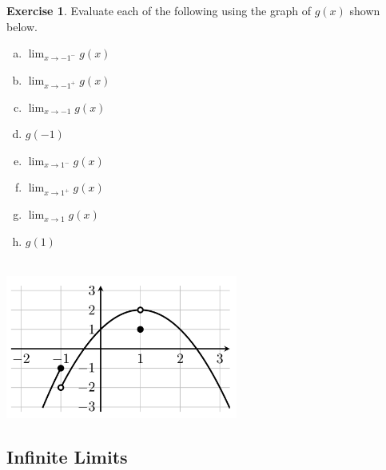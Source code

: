 \documentclass[11pt,reqno,final]{amsart}
\numberwithin{equation}{section}
\numberwithin{figure}{section}
\theoremstyle{definition} %
\newtheorem{exercise}[question]{Exercise}
\begin{document}
\begin{exercise}
        Evaluate each of the following using the graph of $g(x)$ shown below.\\

        \begin{minipage}{.5\textwidth}
                \begin{enumerate}[(a)]\itemsep+7pt
                \item $\displaystyle\lim_{x \to -1^-} g(x)$\\
                \item $\displaystyle\lim_{x \to -1^+} g(x)$\\
                \item $\displaystyle\lim_{x \to -1} g(x)$\\
                \item $g(-1)$\\
                \item $\displaystyle\lim_{x \to 1^-} g(x)$\\
                \item $\displaystyle\lim_{x \to 1^+} g(x)$\\
                \item $\displaystyle\lim_{x \to 1} g(x)$\\
                \item $g(1)$
                \end{enumerate}
        \end{minipage}
        \begin{minipage}{.5\textwidth}
                $ $\\

                \includegraphics[width=3in]{09-18P_ex.png}
        \end{minipage}
\end{exercise}

\newpage

\subsection{Infinite Limits}
\end{document}
